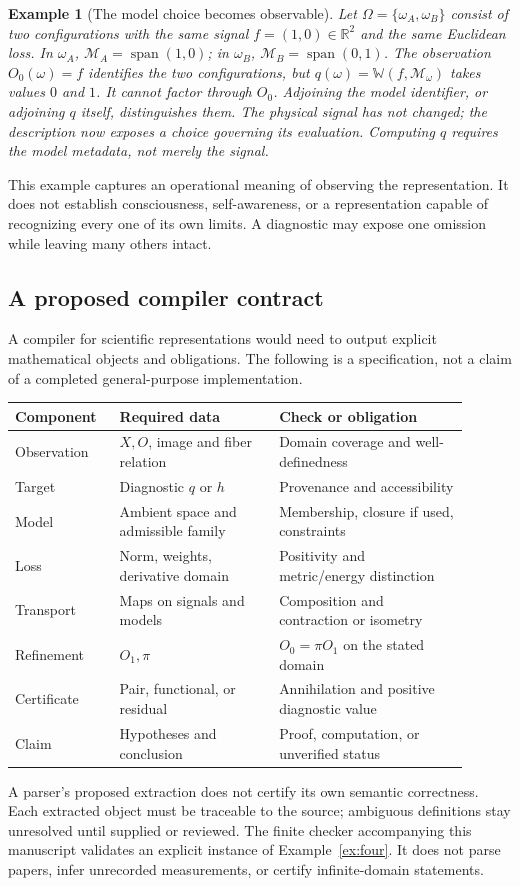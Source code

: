 \documentclass[11pt,letterpaper]{article}
\newtheorem{example}[theorem]{Example}
\newcommand{\MM}{\mathcal M}
\newcommand{\WW}{\mathbb W}
\newcommand{\R}{\mathbb R}
\begin{document}
\begin{example}[The model choice becomes observable]\label{ex:meta}
Let $\Omega=\{\omega_A,\omega_B\}$ consist of two configurations with
the same signal $f=(1,0)\in\R^2$ and the same Euclidean loss.
In $\omega_A$, $\MM_A=\operatorname{span}(1,0)$; in $\omega_B$,
$\MM_B=\operatorname{span}(0,1)$.
The observation $O_0(\omega)=f$ identifies the two configurations, but
$q(\omega)=\WW(f,\MM_\omega)$ takes values $0$ and $1$.
It cannot factor through $O_0$. Adjoining the model identifier, or
adjoining $q$ itself, distinguishes them. The physical signal has not
changed; the description now exposes a choice governing its evaluation.
Computing $q$ requires the model metadata, not merely the signal.
\end{example}

This example captures an operational meaning of observing the
representation. It does not establish consciousness, self-awareness,
or a representation capable of recognizing every one of its own limits.
A diagnostic may expose one omission while leaving many others intact.

\subsection{A proposed compiler contract}
A compiler for scientific representations would need to output explicit
mathematical objects and obligations. The following is a specification,
not a claim of a completed general-purpose implementation.
\begin{center}
\small
\begin{tabular}{p{0.20\linewidth}p{0.32\linewidth}p{0.38\linewidth}}
\toprule
Component & Required data & Check or obligation\\
\midrule
Observation & $X,O$, image and fiber relation & Domain coverage and well-definedness\\
Target & Diagnostic $q$ or $h$ & Provenance and accessibility\\
Model & Ambient space and admissible family & Membership, closure if used, constraints\\
Loss & Norm, weights, derivative domain & Positivity and metric/energy distinction\\
Transport & Maps on signals and models & Composition and contraction or isometry\\
Refinement & $O_1,\pi$ & $O_0=\pi O_1$ on the stated domain\\
Certificate & Pair, functional, or residual & Annihilation and positive diagnostic value\\
Claim & Hypotheses and conclusion & Proof, computation, or unverified status\\
\bottomrule
\end{tabular}
\end{center}
A parser's proposed extraction does not certify its own semantic
correctness. Each extracted object must be traceable to the source;
ambiguous definitions stay unresolved until supplied or reviewed.
The finite checker accompanying this manuscript validates an explicit
instance of Example~\ref{ex:four}. It does not parse papers, infer
unrecorded measurements, or certify infinite-domain statements.
\end{document}
